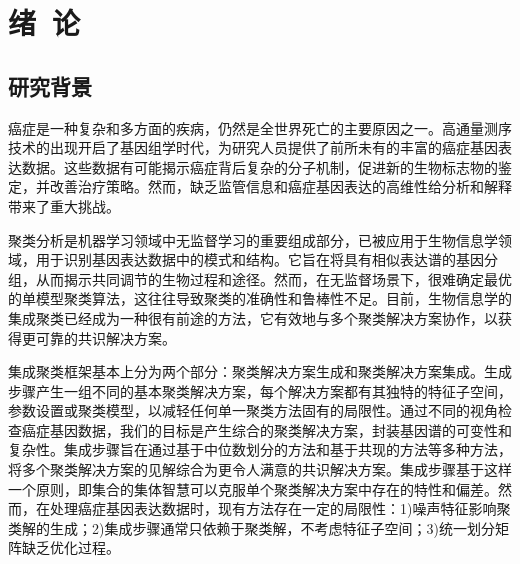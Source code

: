 \documentclass[unicode,pdfcover]{hquthesis}
\begin{document}
\tableofcontents{}%



\mainmatter

\chapter{绪\ 论}\label{chapter_IN}

\section{研究背景}
癌症是一种复杂和多方面的疾病，仍然是全世界死亡的主要原因之一。高通量测序技术的出现开启了基因组学时代，为研究人员提供了前所未有的丰富的癌症基因表达数据。这些数据有可能揭示癌症背后复杂的分子机制，促进新的生物标志物的鉴定，并改善治疗策略。然而，缺乏监管信息和癌症基因表达的高维性给分析和解释带来了重大挑战。

聚类分析是机器学习领域中无监督学习的重要组成部分，已被应用于生物信息学领域，用于识别基因表达数据中的模式和结构\cite{Li2023AngClust,Singh2023Gene,Mirzal2022Statistical,shi2024boosted}。它旨在将具有相似表达谱的基因分组，从而揭示共同调节的生物过程和途径。然而，在无监督场景下，很难确定最优的单模型聚类算法，这往往导致聚类的准确性和鲁棒性不足\cite{Kleinberg2002,liu2024rpsc}。目前，生物信息学的集成聚类已经成为一种很有前途的方法，它有效地与多个聚类解决方案协作，以获得更可靠的共识解决方案\cite{ECsurvey2015,ECsurvey2022,ECsurvey2018,ELsurvey2020}。

集成聚类框架基本上分为两个部分：聚类解决方案生成和聚类解决方案集成。生成步骤产生一组不同的基本聚类解决方案，每个解决方案都有其独特的特征子空间\cite{Yu2018Semi,Yu2017Adaptive}，参数设置\cite{Huang2017Locally,Yang2019Adaptive,yang2019hybrid}或聚类模型\cite{Yousefnezhad2018WoCE,Huang2016Robust}，以减轻任何单一聚类方法固有的局限性。通过不同的视角检查癌症基因数据，我们的目标是产生综合的聚类解决方案，封装基因谱的可变性和复杂性。集成步骤旨在通过基于中位数划分的方法\cite{Topchy2005Clustering,Franek2014Ensemble,Huang2016Ensemble,Wu2013theoretic,Wu2015Means,Liu2017Spectral}和基于共现的方法\cite{Bai2019Information,Yang2019Adaptive,Huang2021Enhanced,Zhou2021Self,Khan2021Ensemble,Yu2022Clustering,Huang2022Toward,Tao2023From,Shi2023Adaptive,Shi2024Consensus}等多种方法，将多个聚类解决方案的见解综合为更令人满意的共识解决方案。集成步骤基于这样一个原则，即集合的集体智慧可以克服单个聚类解决方案\cite{ECsurvey2015,ECsurvey2022,Li2024Exploring,chen2024survey}中存在的特性和偏差。然而，在处理癌症基因表达数据时，现有方法存在一定的局限性：1)噪声特征影响聚类解的生成；2)集成步骤通常只依赖于聚类解，不考虑特征子空间；3)统一划分矩阵缺乏优化过程。
\end{document}
